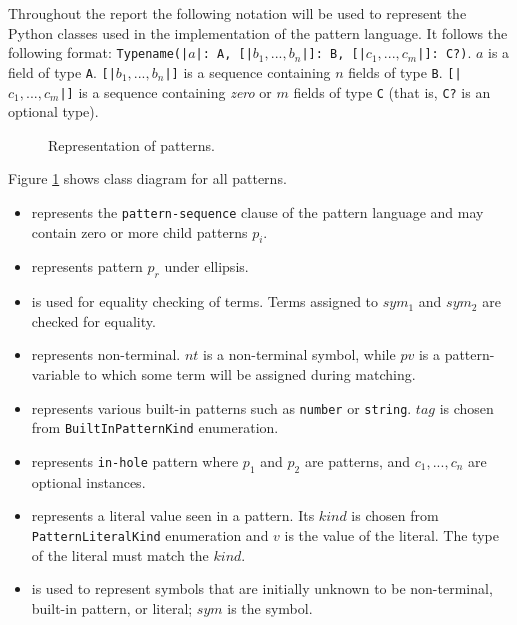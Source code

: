 Throughout the report the following notation will be used to represent the Python classes used in the implementation of the pattern language. It follows the following format: \texttt{Typename(|$a$|: A, [|$b_1,...,b_n$|]: B, [|$c_1,...,c_m$|]: C?)}. $a$ is a field of type \texttt{A}. \texttt{[|$b_1,...,b_n$|]} is a sequence containing $n$ fields of type \texttt{B}. \texttt{[|$c_1,...,c_m$|]} is a sequence containing \textit{zero} or $m$ fields of type \texttt{C} (that is, \texttt{C?} is an optional type).

\begin{figure}[ht]
	\centering
	\caption{Representation of patterns.}
\label{class-diagram-pattern}
\end{figure}

Figure \ref{class-diagram-pattern} shows class diagram for all patterns.

\begin{itemize}
\item
\PatternSequence \space represents the \texttt{pattern-sequence} clause of the pattern language and may contain zero or more child patterns $p_i$. 

\item 
\PatternRepeat \space represents pattern $p_r$ under ellipsis.

\item
\PatternCheckConstraint is used for equality checking of terms. Terms assigned to $sym_1$ and $sym_2$ are checked for equality.

\item 
\NonTerminal \space represents non-terminal. $nt$ is a non-terminal symbol, while $pv$ is a pattern-variable to which some term will be assigned during matching. 

\item
\BuiltInPattern \space represents various built-in patterns such as \texttt{number} or \texttt{string}. $tag$ is chosen from \texttt{BuiltInPatternKind} enumeration.

\item
\PatternInHole \space represents \texttt{in-hole} pattern where $p_1$ and $p_2$ are patterns, and $c_1, ..., c_n$ are optional \ConstraintCheckNoArg \space instances.

\item 
\LiteralPattern \space represents a literal value seen in a pattern. Its $kind$ is chosen from \texttt{PatternLiteralKind} enumeration and $v$ is the value of the literal. The type of the literal must match the $kind$.

\item 
\UnresolvedSymbol is used to represent symbols that are initially unknown to be non-terminal, built-in pattern, or literal; $sym$ is the symbol.

\end{itemize}
